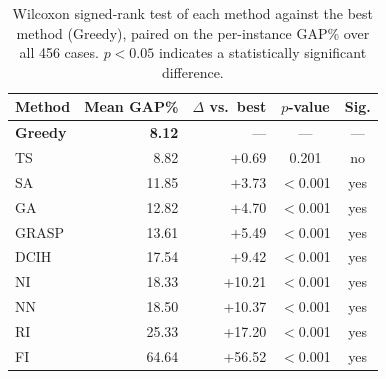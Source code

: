 \begin{table}[t]
\centering
\caption{Wilcoxon signed-rank test of each method against the best method (Greedy), paired on the per-instance GAP\% over all 456 cases. $p<0.05$ indicates a statistically significant difference.}
\label{tab:wilcoxon}
\begin{tabular}{lrrcc}
\hline
Method & Mean GAP\% & $\Delta$ vs.\ best & $p$-value & Sig. \\
\hline
\textbf{Greedy} & \textbf{8.12} & --- & --- & --- \\
TS & 8.82 & +0.69 & 0.201 & no \\
SA & 11.85 & +3.73 & $<$0.001 & yes \\
GA & 12.82 & +4.70 & $<$0.001 & yes \\
GRASP & 13.61 & +5.49 & $<$0.001 & yes \\
DCIH & 17.54 & +9.42 & $<$0.001 & yes \\
NI & 18.33 & +10.21 & $<$0.001 & yes \\
NN & 18.50 & +10.37 & $<$0.001 & yes \\
RI & 25.33 & +17.20 & $<$0.001 & yes \\
FI & 64.64 & +56.52 & $<$0.001 & yes \\
\hline
\end{tabular}
\end{table}
